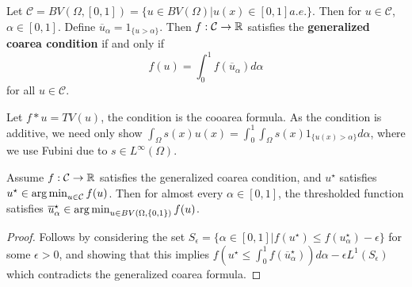 \begin{defn}
  Let $\mathcal{C} = BV(\Omega, [0, 1]) = \{ u \in BV(\Omega) | u(x)
  \in [0, 1] a.e. \}$.  Then for $u \in \mathcal{C}$, $\alpha \in [0,
  1]$.  Define $\overline u_{\alpha} = 1_{\{ u > \alpha \} }$. Then
  $f: \mathcal{C} \rightarrow \mathbb{R}$ satisfies the \textbf{generalized
    coarea condition} if and only if
  \begin{equation}
    \label{eq:59}
    f(u) = \int_{0}^{1} f(\overline u_{\alpha}) d\alpha
  \end{equation} for all $u \in \mathcal{C}$.
\end{defn}

\begin{thm}
  Let $f*u = TV(u)$, the condition is the cooarea formula.  As the
  condition is additive, we need only show $\int_{\Omega} s(x) u(x)
  = \int_{0}^{1} \int_{\Omega} s(x) 1_{\{ u(x) > \alpha \}} d\alpha$,
  where we use Fubini due to $s \in L^{\infty}(\Omega)$.
\end{thm}

\begin{thm}
  Assume $f: \mathcal{C} \rightarrow \mathbb{R}$ satisfies the generalized
  coarea condition, and $u^{\star}$ satisfies $u^{\star} \in
  \operatorname*{arg\,min}_{u \in \mathcal{C}} f(u)$. Then for almost every $\alpha \in
  [0, 1]$, the thresholded function satisfies $\overline
  u_{\alpha}^{\star} \in \operatorname*{arg\,min}_{u \in BV(\Omega, \{ 0, 1 \})} f(u)$.
\end{thm}

\begin{proof}
  Follows by considering the set $S_{\epsilon} = \{ \alpha \in [0, 1]
  | f(u^{\star}) \leq f(u^{\star}_{\alpha}) - \epsilon \} $ for some
  $\epsilon > 0$, and showing that this implies $f(u^{\star} \leq
  \int_{0}^{1} f(\overline u_{\alpha}^{\star})) d\alpha - \epsilon
  L^{1}(S_{\epsilon})$ which contradicts the generalized coarea formula.
\end{proof}



